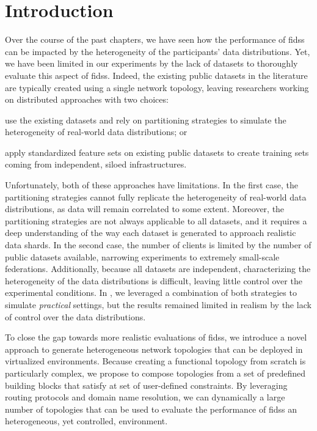 \section{Introduction\label{sec:topologies.intro}}

Over the course of the past chapters, we have seen how the performance of \glspl{fids} can be impacted by the heterogeneity of the participants' data distributions.
Yet, we have been limited in our experiments by the lack of datasets to thoroughly evaluate this aspect of \glspl{fids}.
Indeed, the existing public datasets in the literature are typically created using a single network topology, leaving researchers working on distributed approaches with two choices:
\begin{enumerate*}[(i)]
    \item use the existing datasets and rely on partitioning strategies to simulate the heterogeneity of real-world data distributions; or
    \item apply standardized feature sets on existing public datasets to create training sets coming from independent, siloed infrastructures.
\end{enumerate*}

Unfortunately, both of these approaches have limitations.
In the first case, the partitioning strategies cannot fully replicate the heterogeneity of real-world data distributions, as data will remain correlated to some extent.
Moreover, the partitioning strategies are not always applicable to all datasets, and it requires a deep understanding of the way each dataset is generated to approach realistic data shards.
In the second case, the number of clients is limited by the number of public datasets available, narrowing experiments to extremely small-scale federations.
Additionally, because all datasets are independent, characterizing the heterogeneity of the data distributions is difficult, leaving little control over the experimental conditions.
In , we leveraged a combination of both strategies to simulate \emph{practical}  settings, but the results remained limited in realism by the lack of control over the data distributions.

To close the gap towards more realistic evaluations of \glspl{fids}, we introduce a novel approach to generate heterogeneous network topologies that can be deployed in virtualized environments.
Because creating a functional topology from scratch is particularly complex, we propose to compose topologies from a set of predefined building blocks that satisfy at set of user-defined constraints.
By leveraging routing protocols and domain name resolution, we can dynamically a large number of topologies that can be used to evaluate the performance of \glspl{fids} an heterogeneous, yet controlled, environment.

